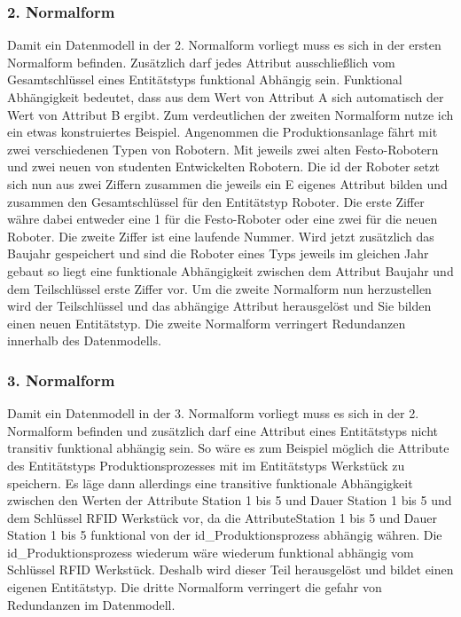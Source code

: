 \subsubsection*{2. Normalform}
Damit ein Datenmodell in der 2. Normalform vorliegt muss es sich in der ersten Normalform befinden. Zusätzlich darf jedes Attribut ausschließlich vom Gesamtschlüssel eines Entitätstyps funktional Abhängig sein. Funktional Abhängigkeit bedeutet, dass aus dem Wert von Attribut A sich automatisch der Wert von Attribut B ergibt. Zum verdeutlichen der zweiten Normalform nutze ich ein etwas konstruiertes Beispiel. Angenommen die Produktionsanlage fährt mit zwei verschiedenen Typen von Robotern. Mit jeweils zwei alten Festo-Robotern und zwei neuen von studenten Entwickelten Robotern. Die id der Roboter setzt sich nun aus zwei Ziffern zusammen die jeweils ein E
eigenes Attribut bilden und zusammen den Gesamtschlüssel für den Entitätstyp Roboter. Die erste Ziffer währe dabei entweder eine 1 für die Festo-Roboter oder eine zwei für die neuen Roboter. Die zweite Ziffer ist eine laufende Nummer. Wird jetzt zusätzlich das Baujahr gespeichert und sind die Roboter eines Typs jeweils im gleichen Jahr gebaut so liegt eine funktionale Abhängigkeit zwischen dem Attribut Baujahr und dem Teilschlüssel erste Ziffer vor. Um die zweite Normalform nun herzustellen wird der Teilschlüssel und das abhängige Attribut herausgelöst und Sie bilden einen neuen Entitätstyp. Die zweite Normalform verringert Redundanzen innerhalb des Datenmodells.\cite{Heuer:2001}

\subsubsection*{3. Normalform}
Damit ein Datenmodell in der 3. Normalform vorliegt muss es sich in der 2. Normalform befinden und zusätzlich darf eine Attribut eines Entitätstyps nicht transitiv funktional abhängig sein.  So wäre es zum Beispiel möglich die Attribute des Entitätstyps Produktionsprozesses mit im Entitätstyps Werkstück zu speichern. Es läge dann allerdings eine transitive funktionale Abhängigkeit zwischen den Werten der Attribute Station 1 bis 5 und Dauer Station 1 bis 5 und dem Schlüssel RFID Werkstück vor, da die AttributeStation 1 bis 5 und Dauer Station 1 bis 5 funktional von der id\_Produktionsprozess abhängig währen. Die id\_Produktionsprozess wiederum wäre wiederum funktional abhängig vom Schlüssel RFID Werkstück. Deshalb wird dieser Teil herausgelöst und bildet einen eigenen Entitätstyp. Die dritte Normalform verringert die gefahr von Redundanzen im Datenmodell.\cite{Heuer:2001}

